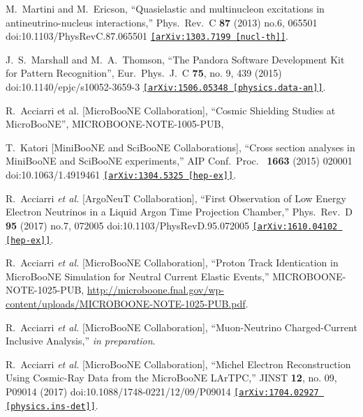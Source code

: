 \documentclass[a4paper]{article}
\begin{document}
\begin{thebibliography}{99}
  M.~Martini and M.~Ericson,
  ``Quasielastic and multinucleon excitations in antineutrino-nucleus interactions,''
  Phys.\ Rev.\ C \textbf{87} (2013) no.6,  065501
  doi:10.1103/PhysRevC.87.065501
  \href{https://arxiv.org/abs/1303.7199}{\texttt{[arXiv:1303.7199 [nucl-th]]}}.
  
 
   J.~S.~Marshall and M.~A.~Thomson, 
  ``The Pandora Software Development Kit for Pattern Recognition'', Eur.\ Phys.\ J.\ C \textbf{75}, no. 9, 439 (2015) doi:10.1140/epjc/s10052-3659-3 \href{https://arxiv.org/abs/1506.05348}{\texttt{[arXiv:1506.05348 [physics.data-an]]}}.
 
   R.~Acciarri et al. [MicroBooNE Collaboration], ``Cosmic Shielding Studies at MicroBooNE'', MICROBOONE-NOTE-1005-PUB, \href{http://microboone.fnal.gov/wp-content/uploads/MICROBOONE-NOTE-1005-PUB.pdf}{}

  T.~Katori [MiniBooNE and SciBooNE Collaborations],
  ``Cross section analyses in MiniBooNE and SciBooNE experiments,''
  AIP Conf.\ Proc.\  \textbf{ 1663} (2015) 020001
  doi:10.1063/1.4919461
  \href{https://arxiv.org/abs/1304.5325}{\texttt{[arXiv:1304.5325 [hep-ex]]}}.
  
  R.~Acciarri \emph{et al.} [ArgoNeuT Collaboration],
  ``First Observation of Low Energy Electron Neutrinos in a Liquid Argon Time Projection Chamber,''
  Phys.\ Rev.\ D \textbf{ 95} (2017) no.7,  072005
  doi:10.1103/PhysRevD.95.072005
  \href{https://arxiv.org/abs/1610.04102}{\texttt{[arXiv:1610.04102 [hep-ex]]}}.
  
  R.~Acciarri \emph{et al.} [MicroBooNE Collaboration],
  ``Proton Track Identication in MicroBooNE Simulation for Neutral Current Elastic Events,'' MICROBOONE-NOTE-1025-PUB,
  \url{http://microboone.fnal.gov/wp-content/uploads/MICROBOONE-NOTE-1025-PUB.pdf}.

  R.~Acciarri \emph{et al.} [MicroBooNE Collaboration],
  ``Muon-Neutrino Charged-Current Inclusive Analysis,'' \emph{in preparation}.

  R.~Acciarri {\it et al.} [MicroBooNE Collaboration],
  ``Michel Electron Reconstruction Using Cosmic-Ray Data from the MicroBooNE LArTPC,''
  JINST {\bf 12}, no. 09, P09014 (2017)
  doi:10.1088/1748-0221/12/09/P09014
  \href{https://arxiv.org/abs/1704.02927}{\texttt{[arXiv:1704.02927 [physics.ins-det]]}}.


\end{thebibliography}
\end{document}
